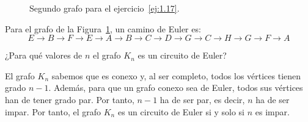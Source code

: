 \begin{ejercicio}
    \begin{figure}
        \centering
        
        
        \caption{Segundo grafo para el ejercicio~\ref{ej:1.17}.}
        \label{fig:1.17_2}
    \end{figure}

    Para el grafo de la Figura~\ref{fig:1.17_2}, un camino de Euler es:
    \begin{equation*}
        E\to B\to F\to E\to A\to B \to C\to D\to G\to C\to H\to G\to F\to A
    \end{equation*}
\end{ejercicio}

\begin{ejercicio}\label{ej:1.18}
    ¿Para qué valores de $n$ el grafo $K_n$ es un circuito de Euler?

    El grafo $K_n$ sabemos que es conexo y, al ser completo, todos los vértices tienen grado $n-1$. Además, para que un grafo conexo sea de Euler, todos sus vértices han de tener grado par. Por tanto, $n-1$ ha de ser par, es decir, $n$ ha de ser impar. Por tanto, el grafo $K_n$ es un circuito de Euler si y solo si $n$ es impar.
\end{ejercicio}

